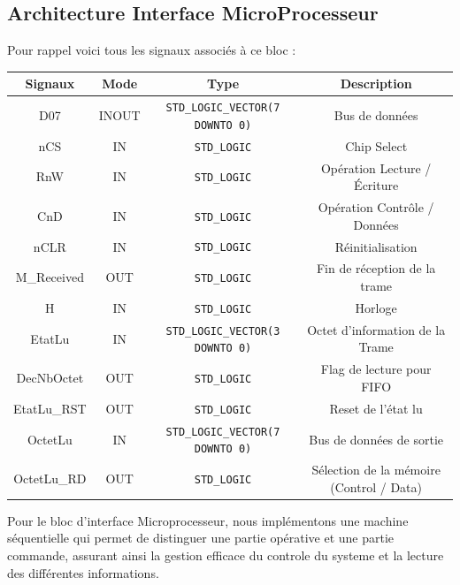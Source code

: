 \subsection{Architecture Interface MicroProcesseur}

Pour rappel voici tous les signaux associés à ce bloc : 
\newline

\begin{center}
    \begin{tabular}{| c || c | c | c |}
     \hline			
       \textbf{Signaux} & \textbf{Mode} & \textbf{Type} & \textbf{Description}  \\ \hline 
       D07 & INOUT & \texttt{STD\_LOGIC\_VECTOR(7 DOWNTO 0)} & Bus de données \\
       nCS & IN & \texttt{STD\_LOGIC} & Chip Select \\
       RnW & IN & \texttt{STD\_LOGIC} & Opération Lecture / Écriture \\
       CnD & IN & \texttt{STD\_LOGIC} & Opération Contrôle / Données \\
       nCLR & IN & \texttt{STD\_LOGIC} & Réinitialisation \\
       M\_Received & OUT & \texttt{STD\_LOGIC} & Fin de réception de la trame \\
       H & IN & \texttt{STD\_LOGIC} & Horloge \\
       EtatLu & IN & \texttt{STD\_LOGIC\_VECTOR(3 DOWNTO 0)} & Octet d'information de la Trame \\
       DecNbOctet & OUT & \texttt{STD\_LOGIC} & Flag de lecture pour FIFO \\
       EtatLu\_RST & OUT & \texttt{STD\_LOGIC} & Reset de l'état lu \\
       OctetLu & IN & \texttt{STD\_LOGIC\_VECTOR(7 DOWNTO 0)} & Bus de données de sortie \\
       OctetLu\_RD & OUT & \texttt{STD\_LOGIC} & Sélection de la mémoire (Control / Data) \\
     \hline  
    \end{tabular}
\end{center}

Pour le bloc d'interface Microprocesseur, nous implémentons une machine séquentielle qui permet de distinguer une partie opérative et une partie commande, assurant ainsi la gestion efficace du controle du systeme et la lecture des différentes informations.

